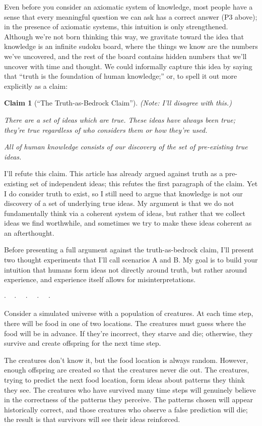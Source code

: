 \documentclass[11pt, oneside]{article}
\newtheorem*{claim}{Claim}
\newcommand{\dotq}{\cdot\quad}
\newcommand{\scenebreak}{
    \medskip\centerline{$\dotq\dotq\dotq\dotq\cdot$}\medskip
}
\begin{document}
Even before you consider an axiomatic system of knowledge, most people have a
sense that every meaningful question we can ask has a correct answer (P3
above); in the presence of axiomatic systems, this intuition is only
strengthened.
Although we're not born thinking this way,
we gravitate toward
the idea that knowledge is an infinite sudoku board, where
the things we know are the numbers we've uncovered, and the rest of the board
contains hidden numbers that we'll uncover with time and thought.
We could informally capture this idea by saying that ``truth is the foundation
of
human knowledge;'' or, to spell it out more explicitly as a claim:
\begin{claim}[``The Truth-as-Bedrock Claim'']
    {\normalfont (Note: I'll disagree with this.)}
    
    There are a set of ideas which are true.
    These ideas have always been true; they're true
    regardless of who considers them or how they're used.

    All of human knowledge consists of our discovery
    of the set of pre-existing true ideas.
\end{claim}

I'll refute this claim.
This article has already argued against truth
as a pre-existing set of independent ideas; this refutes the first paragraph of
the claim.
Yet I do consider truth to exist, so I still need to argue that knowledge is not
our discovery of a set of underlying true ideas.
My argument is that we
do not fundamentally
think via a coherent system of ideas, but rather that we collect ideas we
find worthwhile, and sometimes we try to make these ideas coherent as an
afterthought.

Before presenting a full argument against the truth-as-bedrock claim,
I'll present two
thought experiments that I'll call scenarios A and B.
My goal is to build your intuition that humans form ideas not directly around
truth, but rather around experience, and experience itself allows for
misinterpretations.

\scenebreak

\noindent [{\bf Scenario A.}]\quad
        Consider a simulated universe with a
        population of creatures. At each time step, there will be food in
        one of two locations.
        The creatures must guess where the food will
        be in advance. If they're incorrect, they starve and die; otherwise,
        they survive and create offspring for the next time step.

        The creatures don't know it, but the food location is always random.
        However, enough offspring are created so that the creatures never
        die out. The creatures, trying to predict the next food location,
        form ideas about patterns they think they see.
        The creatures who have survived
        many time steps will genuinely
        believe in the correctness of the patterns they perceive.
        The patterns chosen will appear historically correct, and those
        creatures who observe a false prediction will die; the result is that
        survivors will see their ideas reinforced.
\end{document}
